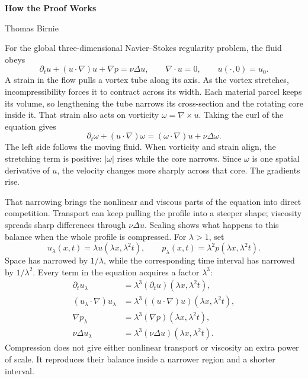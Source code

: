 \documentclass[12pt]{article}
\begin{document}
{\Large\bfseries How the Proof Works\par}
\vspace{0.16\baselineskip}
{\small Thomas Birnie\par}

\vspace{0.55\baselineskip}

For the global three-dimensional Navier--Stokes regularity problem, the fluid
obeys
\[
  \partial_tu+(u\cdot\nabla)u+\nabla p=\nu\Delta u,
  \qquad
  \nabla\cdot u=0,
  \qquad
  u(\cdot,0)=u_0.
\]
A strain in the flow pulls a vortex tube along its axis. As the vortex
stretches, incompressibility forces it to contract across its width. Each
material parcel keeps its volume, so lengthening the tube narrows its
cross-section and the rotating core inside it. That strain also acts on
vorticity \(\omega=\nabla\times u\). Taking the curl of the equation gives
\[
  \partial_t\omega+(u\cdot\nabla)\omega
  =
  (\omega\cdot\nabla)u+\nu\Delta\omega.
\]
The left side follows the moving fluid. When vorticity and strain align, the
stretching term is positive: \(|\omega|\) rises while the core narrows. Since
\(\omega\) is one spatial derivative of \(u\), the velocity changes more
sharply across that core. The gradients rise.

That narrowing brings the nonlinear and viscous parts of the equation into
direct competition. Transport can keep pulling the profile into a steeper
shape; viscosity spreads sharp differences through \(\nu\Delta u\). Scaling
shows what happens to this balance when the whole profile is compressed. For
\(\lambda>1\), set
\[
  u_\lambda(x,t)=\lambda u(\lambda x,\lambda^2t),
  \qquad
  p_\lambda(x,t)=\lambda^2p(\lambda x,\lambda^2t).
\]
Space has narrowed by \(1/\lambda\), while the corresponding time interval has
narrowed by \(1/\lambda^2\). Every term in the equation acquires a factor
\(\lambda^3\):
\[
\begin{aligned}
  \partial_tu_\lambda
  &=\lambda^3(\partial_tu)(\lambda x,\lambda^2t),\\
  (u_\lambda\cdot\nabla)u_\lambda
  &=\lambda^3((u\cdot\nabla)u)(\lambda x,\lambda^2t),\\
  \nabla p_\lambda
  &=\lambda^3(\nabla p)(\lambda x,\lambda^2t),\\
  \nu\Delta u_\lambda
  &=\lambda^3(\nu\Delta u)(\lambda x,\lambda^2t).
\end{aligned}
\]
Compression does not give either nonlinear transport or viscosity an extra
power of scale. It reproduces their balance inside a narrower region and a
shorter interval.
\end{document}
